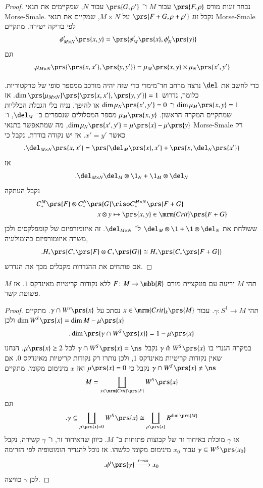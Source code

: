\documentclass[a4paper,10pt,twoside,openany]{book}
\begin{document}
\begin{proof}
נבחר זוגות מורס
$\prs{F,\rho}$
עבור
$M$
ו־%
$\prs{G, \rho'}$
עבור
$N$,
שמקיימים את תנאי
\textenglish{Morse-Smale}.
נקבל זוג
$\prs{F+G, \rho + \rho'}$
על
$M \times N$,
שמקיים את תנאי
\textenglish{Morse-Smale}
לפי בדיקה ישירה.
מתקיים
\begin{align*}
\phi_{M \times N}^t \prs{x,y} &= \prs{\phi_M^t\prs{x}, \phi_N^t\prs{y}}
\end{align*}
וגם
\begin{align*}
\text{.} \mu_{M \times N}\prs{\prs{x,x'}, \prs{y, y'}} = \mu_M\prs{x,y} \times \mu_N\prs{x',y'}
\end{align*}

כדי לחשב את
$\del$
נרצה מרחב חד־מימדי כדי שזה יהיה מורכב ממספר סופי של טרקטוריות.
כלומר, נדרוש
$\dim \prs{\mu_{M \times N}}\prs{\prs{x,x'},\prs{y,y'}} = 1$.
אז
$\dim \mu_M\prs{x,y} = 1$
ו־%
$\dim \mu_N\prs{x',y'} = 0$
או להיפך.
נניח בלי הגבלת הכלליות שמתקיים המקרה הראשון.
$\mu_M\prs{x,y}$
מספר המסלולים שנספרים ב־%
$\del_M$,
ו־%
$\dim \mu_N\prs{x',y'} = \mu\prs{x} - \mu\prs{y}$,
מה שמתאפשר בתנאי
\textenglish{Morse-Smale}
רק כאשר
$x' = y'$.
אז יש נקודה בודדת.
נקבל כי
\[\text{.} \del_{M \times N} \prs{x, x'} = \prs{\del_M \prs{x}, x'} + \prs{x, \del_N \prs{x'}}\]
אז
\[\text{.} \del_{M \times N} \del_M \otimes \1_N + \1_M \otimes \del_N\]
נקבל העתקה
\begin{align*}
C^M_* \prs{F} \otimes C^N_*\prs{G} &\riso C_*^{M \times N}\prs{F + G} \\
x \otimes y &\mapsto \prs{x,y} \in \mrm{Crit}\prs{F+G}
\end{align*}
ששולחת את
$\del_M \otimes \1 + \1 \otimes \del_N$
ל־%
$\del_{M \times N}$.
זה איזומורפיזם של קומפלקסים ולכן משרה איזומורפיזם בהומולוגיה,
\[\text{.} H_*\prs{C_*\prs{F} \otimes C_*\prs{G}} \cong H_*\prs{C_*\prs{F+G}}\]
אם פותחים את ההגדרות מקבלים מכך את הנדרש.
\end{proof}

\begin{proposition}
תהי
$M$
יריעה עם פונקציית מורס
$F \colon M \to \mbb{R}$
ללא נקודות קריטיות מאינדקס
$1$.
אז
$M$
פשוטת קשר.
\end{proposition}

\begin{proof}
תהי
$\gamma \colon S^1 \to M$.
עבור
$x \in \mrm{Crit}_k\prs{M}$
נסתכ על
$\gamma \cap W^s\prs{x}$.
מתקיים
$\dim W^S\prs{x} = \dim M - \mu\prs{x}$
ולכן
\[\text{.} \dim \prs{\gamma \cap W^S\prs{x}} = 1 - \mu\prs{x}\]
במקרה הגנרי בו
$\gamma \pitchfork W^S\prs{x}$
נקבל
$\gamma \cap W^S\prs{x} = \ns$
לכל
$\mu\prs{x} \geq 2$.
הנחנו שאין נקודות קריטיות מאינדקס
$1$,
ולכן נותרו רק נקודות קריטיות מאינדקס
$0$.
אם
$\gamma \cap W^S\prs{x} \neq \ns$
נקבל כי
$\mu\prs{x} = 0$
ואז
$x$
מינימום מקומי. מתקיים
\[M = \coprod_{x \in \mrm{Crit}\prs{F}} W^S\prs{x}\]
וגם
\[\text{.} \gamma \subseteq \coprod_{\mu\prs{x} = 0} W^S\prs{x} \cong \coprod_{\mu\prs{x}} B^{\dim\prs{M}}\]
אז
$\gamma$
מוכלת באיחוד זר של קבוצות פתוחות ב־%
$M$.
כיוון שהאיחוד זר, ו־%
$\gamma$
קשירה, נקבל
$\gamma \subseteq W^S\prs{x_0}$
עבור
$x_0$
מינימום מקומי כלשהו.
אז נוכל להגדיר הומוטופיה לפי הזרימה
\[\text{.} \phi^t\prs{\gamma} \xrightarrow{t \to \infty} x_0\]
לכן
$\gamma$
כוויצה.
\end{proof}
\end{document}
